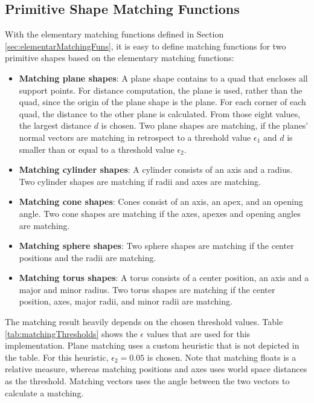 \subsection{Primitive Shape Matching Functions}
\label{sec:primitiveShapeMatchingFuns}

With the elementary matching functions defined in Section \ref{sec:elementarMatchingFuns}, it is easy to define matching functions for two primitive shapes based on the elementary matching functions:

\begin{itemize}
\item \textbf{Matching plane shapes}: 
A plane shape contains to a quad that encloses all support points. For distance computation, the plane is used, rather than the quad, since the origin of the plane shape is the plane. For each corner of each quad, the distance to the other plane is calculated. From those eight values, the largest distance $d$ is chosen. Two plane shapes are matching, if the planes' normal vectors are matching in retrospect to a threshold value $\epsilon_1$ and $d$ is smaller than or equal to a threshold value $\epsilon_2$.
\item \textbf{Matching cylinder shapes}: 
A cylinder consists of an axis and a radius. Two cylinder shapes are matching if radii and axes are matching. 
\item \textbf{Matching cone shapes}:
Cones consist of an axis, an apex, and an opening angle. Two cone shapes are matching if the axes, apexes and opening angles are matching. 
\item \textbf{Matching sphere shapes}: 
Two sphere shapes are matching if the center positions and the radii are matching. 
\item \textbf{Matching torus shapes}: 
A torus consists of a center position, an axis and a major and minor radius. Two torus shapes are matching if the center position, axes, major radii, and minor radii are matching. 
\end{itemize}

The matching result heavily depends on the chosen threshold values. Table \ref{tab:matchingThresholds} shows the $\epsilon$ values that are used for this implementation. Plane matching uses a custom heuristic that is not depicted in the table. For this heuristic, $\epsilon_2 = 0.05$ is chosen. Note that matching floats is a relative measure, whereas matching positions and axes uses world space distances as the threshold. Matching vectors uses the angle between the two vectors to calculate a matching. 

